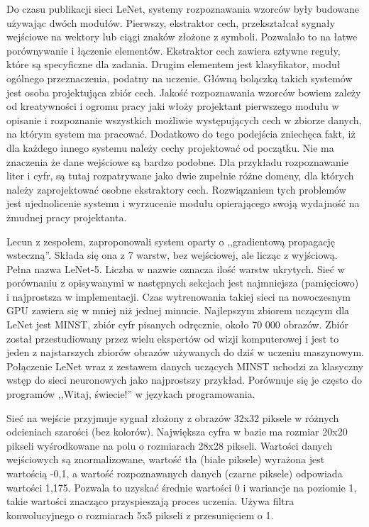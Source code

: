 \documentclass[12pt,a4paper,twoside,titlepage,openright]{book}
\begin{document}
Do czasu publikacji sieci LeNet, systemy rozpoznawania wzorców były budowane używając dwóch modułów. Pierwszy, ekstraktor cech, przekształcał sygnały wejściowe na wektory lub ciągi znaków złożone z symboli. Pozwalało to na łatwe porównywanie i łączenie elementów. Ekstraktor cech zawiera sztywne reguły, które są specyficzne dla zadania. Drugim elementem jest klasyfikator, moduł ogólnego przeznaczenia, podatny na uczenie. Główną bolączką takich systemów jest osoba projektująca zbiór cech. Jakość rozpoznawania wzorców bowiem zależy od kreatywności i ogromu pracy jaki włoży projektant pierwszego modułu w opisanie i rozpoznanie wszystkich możliwie występujących cech w zbiorze danych, na którym system ma pracować. Dodatkowo do tego podejścia zniechęca fakt, iż dla każdego innego systemu należy cechy projektować od początku. Nie ma znaczenia że dane wejściowe są bardzo podobne. Dla przykładu rozpoznawanie liter i cyfr, są tutaj rozpatrywane jako dwie zupełnie różne domeny, dla których należy zaprojektować osobne ekstraktory cech. Rozwiązaniem tych problemów jest ujednolicenie systemu i wyrzucenie modułu opierającego swoją wydajność na żmudnej pracy projektanta.

Lecun z zespołem, zaproponowali system oparty o ,,gradientową propagację wsteczną''. Składa się ona z 7 warstw, bez wejściowej, ale licząc z wyjściową. Pełna nazwa LeNet-5. Liczba w nazwie oznacza ilość warstw ukrytych. Sieć w porównaniu z opisywanymi w następnych sekcjach jest najmniejsza (pamięciowo) i najprostsza w implementacji. Czas wytrenowania takiej sieci na nowoczesnym GPU zawiera się w mniej niż jednej minucie. Najlepszym zbiorem uczącym dla LeNet jest MINST, zbiór cyfr pisanych odręcznie, około 70 000 obrazów. Zbiór został przestudiowany przez wielu ekspertów od wizji komputerowej i jest to jeden z najstarszych zbiorów obrazów używanych do dziś w uczeniu maszynowym. Połączenie LeNet wraz z zestawem danych uczących MINST uchodzi za klasyczny wstęp do sieci neuronowych jako najprostszy przykład. Porównuje się je często do programów ,,Witaj, świecie!'' w językach programowania.

Sieć na wejście przyjmuje sygnał złożony z obrazów 32x32 piksele w różnych odcieniach szarości (bez kolorów). Największa cyfra w bazie ma rozmiar 20x20 pikseli wyśrodkowane na polu o rozmiarach 28x28 pikseli. Wartości danych wejściowych są znormalizowane, wartość tła (białe piksele) wyrażona jest wartością -0,1, a wartość rozpoznawanych danych (czarne piksele) odpowiada wartości 1,175. Pozwala to uzyskać średnie wartości 0 i wariancje na poziomie 1, takie wartości znacząco przyspieszają proces uczenia. Używa filtra konwolucyjnego o rozmiarach 5x5 pikseli z przesunięciem o 1.
\end{document}

